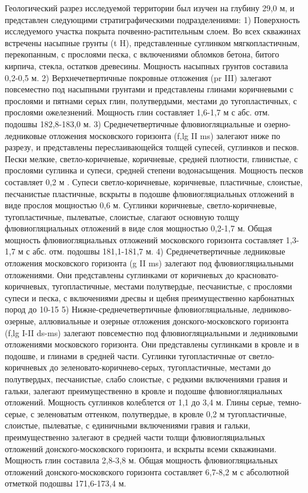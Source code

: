 Геологический разрез исследуемой территории был изучен на глубину 29,0 м, и представлен следующими стратиграфическими подразделениями:
1) Поверхность исследуемого участка покрыта почвенно-растительным слоем. Во всех скважинах встречены насыпные грунты (t H), представленные суглинком мягкопластичным, перекопанным, с прослоями песка, с включениями обломков бетона, битого кирпича, стекла, остатков древесины. Мощность насыпных грунтов составила 0,2-0,5 м.
2) Верхнечетвертичные покровные отложения (pr III) залегают повсеместно под насыпными грунтами и представлены глинами коричневыми с прослоями и пятнами серых глин, полутвердыми, местами до тугопластичных, с прослоями ожелезнений. Мощность глин составляет 1,6-1,7 м с абс. отм. подошвы 182,8-183,0 м.
3) Среднечетвертичные флювиогляциальные и озерно-ледниковые отложения московского горизонта (f,lg II ms) залегают ниже по разрезу, и представлены переслаивающейся толщей супесей, суглинков и песков. Пески мелкие, светло-коричневые, коричневые, средней плотности, глинистые, с прослоями суглинка и супеси, средней степени водонасыщения. Мощность песков составляет 0,2 м . Супеси светло-коричневые, коричневые, пластичные, слоистые, песчанистые пластичные, вскрыты в подошве флювиогляциальных отложений в виде прослоя мощностью 0,6 м. Суглинки коричневые, светло-коричневые, тугопластичные, пылеватые, слоистые, слагают основную толщу флювиогляциальных отложений в виде слоя мощностью 0,2-1,7 м. Общая мощность флювиогляциальных отложений московского горизонта составляет 1,3-1,7 м с абс. отм. подошвы 181,1-181,7 м.
4) Среднечетвертичные ледниковые отложения московского горизонта (g II ms) залегают под флювиогляциальными отложениями. Они представлены суглинками от коричневых до красновато-коричневых, тугопластичные, местами полутвердые, песчанистые, с прослоями супеси и песка, с включениями дресвы и щебня преимущественно карбонатных пород до 10-15%
5) Нижне-среднечетвертичные флювиогляциальные, ледниково-озерные, аллювиальные и озерные отложения донского-московского горизонта (f,lg I-II ds-ms) залегают повсеместно под флювиогляциальными и ледниковыми отложениями московского горизонта. Они представлены суглинками в кровле и в подошве, и глинами в средней части. Суглинки тугопластичные от светло-коричневых до зеленовато-коричнево-серых, тугопластичные, местами до полутвердых, песчанистые, слабо слоистые, с редкими включениями гравия и гальки, залегают преимущественно в кровле и подошве флювиогляциальных отложений. Мощность суглинков колеблется от 1,1 до 3,4 м. Глины серые, темно-серые, с зеленоватым оттенком, полутвердые, в кровле 0,2 м тугопластичные, слоистые, пылеватые, с единичными включениями гравия и гальки, преимущественно залегают в средней части толщи флювиогляциальных отложений донского-московского горизонта, и вскрыты всеми скважинами. Мощность глин составила 2,8-3,8 м. Общая мощность флювиогляциальных отложений донского-московского горизонта составляет 6,7-8,2 м с абсолютной отметкой подошвы 171,6-173,4 м.
